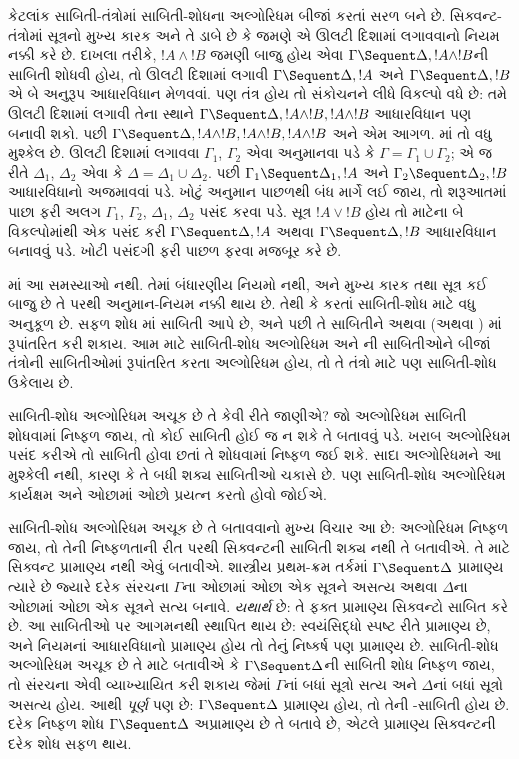 કેટલાંક
સાબિતી-તંત્રોમાં
સાબિતી-શોધના
અલ્ગોરિધમ
બીજાં કરતાં
સરળ બને છે.
સિક્વન્ટ-તંત્રોમાં
સૂત્રનો
મુખ્ય કારક
અને તે ડાબે
છે કે જમણે
એ ઊલટી
દિશામાં લગાવવાનો
નિયમ નક્કી
કરે છે.
દાખલા તરીકે,
$!A \land
!B$ જમણી
બાજુ હોય એવા
$\Gamma \Sequent \Delta, !A \land !B$ની
સાબિતી
શોધવી હોય,
તો
\RightR{\land}
ઊલટી દિશામાં
લગાવી
$\Gamma \Sequent \Delta, !A$
અને
$\Gamma \Sequent \Delta, !B$
એ બે અનુરૂપ
આધારવિધાન
મેળવવાં.
પણ તંત્ર
હોય તો
સંકોચનને લીધે
વિકલ્પો વધે
છે: તમે
\RightR{\Contraction}
ઊલટી દિશામાં
લગાવી તેના
સ્થાને
$\Gamma \Sequent \Delta, !A \land
!B, !A \land !B$
આધારવિધાન
પણ બનાવી
શકો. પછી
$\Gamma \Sequent
\Delta, !A \land !B, !A \land !B, !A \land !B$
અને એમ
આગળ.
માં
તો વધુ
મુશ્કેલ છે.
\RightR{\land}
ઊલટી દિશામાં
લગાવવા
$\Gamma_1$,
$\Gamma_2$
એવા અનુમાનવા
પડે કે
$\Gamma
= \Gamma_1 \cup \Gamma_2$;
એ જ રીતે
$\Delta_1$,
$\Delta_2$
એવા કે
$\Delta
= \Delta_1 \cup \Delta_2$.
પછી
$\Gamma_1 \Sequent \Delta_1, !A$
અને
$\Gamma_2 \Sequent \Delta_2, !B$
આધારવિધાનો
અજમાવવાં
પડે. ખોટું
અનુમાન પાછળથી
બંધ માર્ગે
લઈ જાય,
તો શરૂઆતમાં
પાછા ફરી
અલગ
$\Gamma_1$,
$\Gamma_2$,
$\Delta_1$,
$\Delta_2$
પસંદ કરવા
પડે.
સૂત્ર
$!A \lor !B$
હોય તો
\RightR{\lor}
માટેના બે
વિકલ્પોમાંથી
એક પસંદ
કરી
$\Gamma \Sequent \Delta,
!A$
અથવા
$\Gamma \Sequent \Delta, !B$
આધારવિધાન
બનાવવું પડે.
ખોટી પસંદગી
ફરી પાછળ
ફરવા મજબૂર
કરે છે.

માં
આ સમસ્યાઓ
નથી. તેમાં
બંધારણીય
નિયમો નથી,
અને મુખ્ય કારક
તથા સૂત્ર
કઈ બાજુ છે
તે પરથી
અનુમાન-નિયમ
નક્કી થાય
છે. તેથી
 કે
 કરતાં
સાબિતી-શોધ
માટે વધુ
અનુકૂળ છે.
સફળ શોધ
માં
સાબિતી
આપે છે,
અને પછી
તે સાબિતીને
અથવા
(અથવા
)
માં રૂપાંતરિત
કરી શકાય.
આમ 
માટે સાબિતી-શોધ
અલ્ગોરિધમ
અને
ની
સાબિતીઓને
બીજાં તંત્રોની
સાબિતીઓમાં
રૂપાંતરિત
કરતા અલ્ગોરિધમ
હોય, તો
તે તંત્રો
માટે પણ
સાબિતી-શોધ
ઉકેલાય છે.

સાબિતી-શોધ
અલ્ગોરિધમ
અચૂક છે
તે કેવી
રીતે જાણીએ?
જો અલ્ગોરિધમ
સાબિતી
શોધવામાં
નિષ્ફળ જાય,
તો કોઈ
સાબિતી
હોઈ જ
ન શકે
તે બતાવવું
પડે. ખરાબ
અલ્ગોરિધમ
પસંદ કરીએ
તો સાબિતી
હોવા છતાં
તે શોધવામાં
નિષ્ફળ જઈ
શકે. સાદા
અલ્ગોરિધમને
આ મુશ્કેલી
નથી, કારણ
કે તે
બધી શક્ય
સાબિતીઓ
ચકાસે છે.
પણ સાબિતી-શોધ
અલ્ગોરિધમ
કાર્યક્ષમ
અને ઓછામાં
ઓછો પ્રયત્ન
કરતો હોવો
જોઈએ.

સાબિતી-શોધ
અલ્ગોરિધમ
અચૂક છે
તે બતાવવાનો
મુખ્ય વિચાર
આ છે: અલ્ગોરિધમ
નિષ્ફળ જાય,
તો તેની
નિષ્ફળતાની
રીત પરથી
સિક્વન્ટની
સાબિતી
શક્ય નથી
તે બતાવીએ.
તે માટે
સિક્વન્ટ
પ્રામાણ્ય નથી
એવું બતાવીએ.
શાસ્ત્રીય
પ્રથમ-ક્રમ
તર્કમાં
$\Gamma \Sequent \Delta$
પ્રામાણ્ય ત્યારે
છે જ્યારે
દરેક
સંરચના
$\Gamma$ના
ઓછામાં ઓછા
એક સૂત્રને
અસત્ય અથવા
$\Delta$ના
ઓછામાં ઓછા
એક સૂત્રને
સત્ય બનાવે.
\emph{યથાર્થ}
છે: તે ફક્ત
પ્રામાણ્ય
સિક્વન્ટો
સાબિત
કરે છે.
આ સાબિતીઓ
પર આગમનથી
સ્થાપિત થાય
છે: સ્વયંસિદ્ધો
સ્પષ્ટ રીતે
પ્રામાણ્ય છે,
અને નિયમનાં
આધારવિધાનો
પ્રામાણ્ય હોય
તો તેનું
નિષ્કર્ષ પણ
પ્રામાણ્ય છે.
સાબિતી-શોધ
અલ્ગોરિધમ
અચૂક છે
તે માટે
બતાવીએ કે
$\Gamma \Sequent \Delta$ની
સાબિતી
શોધ નિષ્ફળ
જાય, તો
સંરચના
એવી વ્યાખ્યાયિત
કરી શકાય
જેમાં
$\Gamma$નાં
બધાં
સૂત્રો
સત્ય અને
$\Delta$નાં
બધાં
સૂત્રો
અસત્ય હોય.
આથી
\emph{પૂર્ણ}
પણ છે:
$\Gamma \Sequent \Delta$
પ્રામાણ્ય
હોય, તો
તેની
-સાબિતી
હોય છે.
દરેક નિષ્ફળ
શોધ
$\Gamma \Sequent \Delta$
અપ્રામાણ્ય
છે તે બતાવે
છે, એટલે
પ્રામાણ્ય
સિક્વન્ટની
દરેક શોધ
સફળ થાય.
\endgroup

